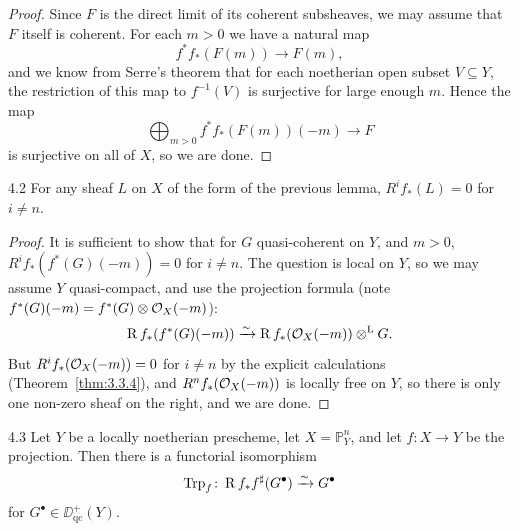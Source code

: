 \begin{proof}
Since $F$ is the direct limit of its coherent subsheaves, we may assume that $F$ itself is coherent. For each $m>0$ we have a natural map
\[
f^*f_*(F(m)) \longrightarrow F(m),
\]
and we know from Serre's theorem \cite[\nopp III,~2.2.1]{EGA} that for each noetherian open subset $V\subseteq Y$, the restriction of this map to $f^{-1}(V)$ is surjective for large enough $m$. Hence the map
\[
\bigoplus_{m>0} f^*f_*(F(m))(-m) \longrightarrow F
\]
is surjective on all of $X$, so we are done.
\end{proof}

\begin{booklemma}{4.2}\label{lem:3.4.2}
For any sheaf $L$ on $X$ of the form of the previous lemma, $R^i f_*(L)=0$ for $i\neq n$.
\end{booklemma}

\begin{proof}
It is sufficient to show that for $G$ quasi-coherent on $Y$, and $m>0$, $R^i f_*(f^*(G)(-m))=0$ for $i\neq n$. The question is local on $Y$, so we may assume $Y$ quasi-compact, and use the projection formula  (note $f^*(G)(-m)=f^*(G)\otimes\mathcal{O}_X(-m)$):
\[
\operatorname{R} f_*(f^*(G)(-m)) \xrightarrow{\sim} \operatorname{R} f_*(\mathcal{O}_X(-m))\mathbin{\otimes^{\mathrm{L}}} G.
\]
But $R^i f_*(\mathcal{O}_X(-m))=0$ for $i\neq n$ by the explicit calculations (Theorem~\ref{thm:3.3.4}), and $R^n f_*(\mathcal{O}_X(-m))$ is locally free on $Y$, so there is only one non-zero sheaf on the right, and we are done.
\end{proof}

\begin{bookproposition}{4.3}\label{prop:3.4.3}
Let $Y$ be a locally noetherian prescheme, let $X=\mathbb{P}^n_Y$, and let $f\colon X\to Y$ be the projection. Then there is a functorial isomorphism
\[
\operatorname{Trp}_f \colon \operatorname{R} f_* f^{\sharp}(G^\bullet) \xrightarrow{\sim} G^\bullet
\]
for $G^\bullet\in\DD_{\mathrm{qc}}^+(Y)$.
\end{bookproposition}

